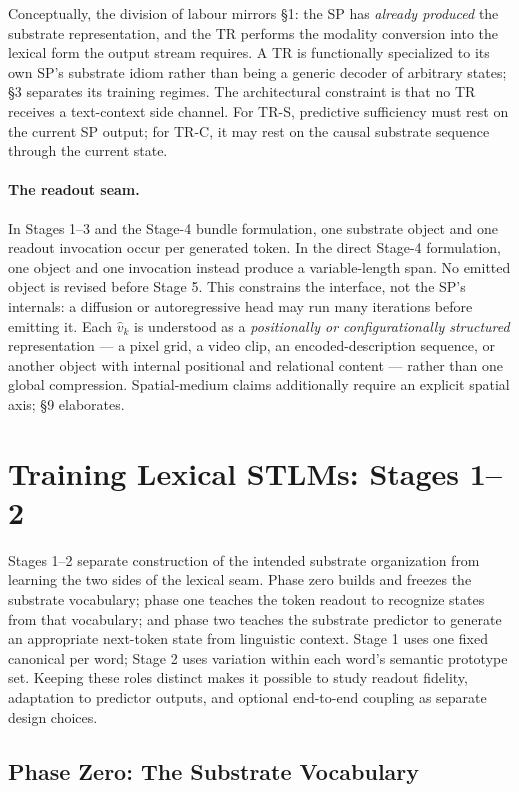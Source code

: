 \documentclass[11pt,a4paper]{article}
\begin{document}
Conceptually, the division of labour mirrors §1: the SP has \emph{already produced} the substrate representation, and the TR performs the modality conversion into the lexical form the output stream requires. A TR is functionally specialized to its own SP's substrate idiom rather than being a generic decoder of arbitrary states; §3 separates its training regimes. The architectural constraint is that no TR receives a text-context side channel. For TR-S, predictive sufficiency must rest on the current SP output; for TR-C, it may rest on the causal substrate sequence through the current state.

\paragraph{The readout seam.} In Stages 1--3 and the Stage-4 bundle formulation, one substrate object and one readout invocation occur per generated token. In the direct Stage-4 formulation, one object and one invocation instead produce a variable-length span. No emitted object is revised before Stage 5. This constrains the interface, not the SP's internals: a diffusion or autoregressive head may run many iterations before emitting it. Each $\hat v_k$ is understood as a \emph{positionally or configurationally structured} representation --- a pixel grid, a video clip, an encoded-description sequence, or another object with internal positional and relational content --- rather than one global compression. Spatial-medium claims additionally require an explicit spatial axis; §9 elaborates.

\section{Training Lexical STLMs: Stages 1--2}

Stages 1--2 separate construction of the intended substrate organization from learning the two sides of the lexical seam. Phase zero builds and freezes the substrate vocabulary; phase one teaches the token readout to recognize states from that vocabulary; and phase two teaches the substrate predictor to generate an appropriate next-token state from linguistic context. Stage 1 uses one fixed canonical per word; Stage 2 uses variation within each word's semantic prototype set. Keeping these roles distinct makes it possible to study readout fidelity, adaptation to predictor outputs, and optional end-to-end coupling as separate design choices.

\subsection{Phase Zero: The Substrate Vocabulary}
\end{document}
